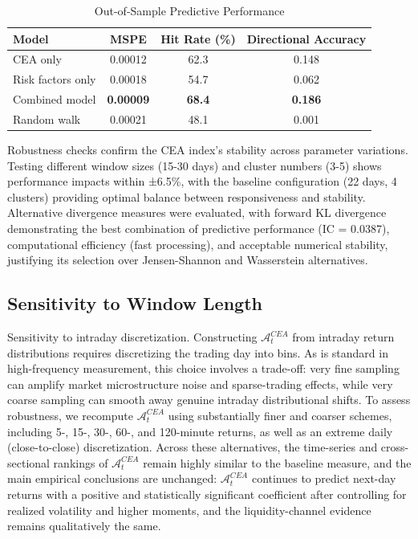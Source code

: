 \documentclass[preprint,12pt,authoryear]{elsarticle}
\renewcommand{\textcolor}[2]{\begingroup\color{#1}#2\endgroup}
\begin{document}
\begin{table}[h]
\centering
\caption{Out-of-Sample Predictive Performance}
\begin{tabularx}{\textwidth}{Xccc}
\toprule
\textbf{Model} & \textbf{MSPE} & \textbf{Hit Rate (\%)} & \textbf{Directional Accuracy} \\
\midrule
CEA only & 0.00012 & 62.3 & 0.148 \\
Risk factors only & 0.00018 & 54.7 & 0.062 \\
Combined model & \textbf{0.00009} & \textbf{68.4} & \textbf{0.186} \\
Random walk & 0.00021 & 48.1 & 0.001 \\
\bottomrule
\end{tabularx}
\end{table}

Robustness checks confirm the CEA index's stability across parameter variations. Testing different window sizes (15-30 days) and cluster numbers (3-5) shows performance impacts within ±6.5\%, with the baseline configuration (22 days, 4 clusters) providing optimal balance between responsiveness and stability. Alternative divergence measures were evaluated, with forward KL divergence demonstrating the best combination of predictive performance (IC = 0.0387), computational efficiency (fast processing), and acceptable numerical stability, justifying its selection over Jensen-Shannon and Wasserstein alternatives.

\subsection{Sensitivity to Window Length}
\textcolor{red}{Sensitivity to intraday discretization. Constructing $\mathcal{A}^{CEA}_t$ from intraday return distributions requires discretizing the trading day into bins. As is standard in high-frequency measurement, this choice involves a trade-off: very fine sampling can amplify market microstructure noise and sparse-trading effects, while very coarse sampling can smooth away genuine intraday distributional shifts. To assess robustness, we recompute $\mathcal{A}^{CEA}_t$ using substantially finer and coarser schemes, including 5-, 15-, 30-, 60-, and 120-minute returns, as well as an extreme daily (close-to-close) discretization. Across these alternatives, the time-series and cross-sectional rankings of $\mathcal{A}^{CEA}_t$ remain highly similar to the baseline measure, and the main empirical conclusions are unchanged: $\mathcal{A}^{CEA}_t$ continues to predict next-day returns with a positive and statistically significant coefficient after controlling for realized volatility and higher moments, and the liquidity-channel evidence remains qualitatively the same.}
\end{document}
